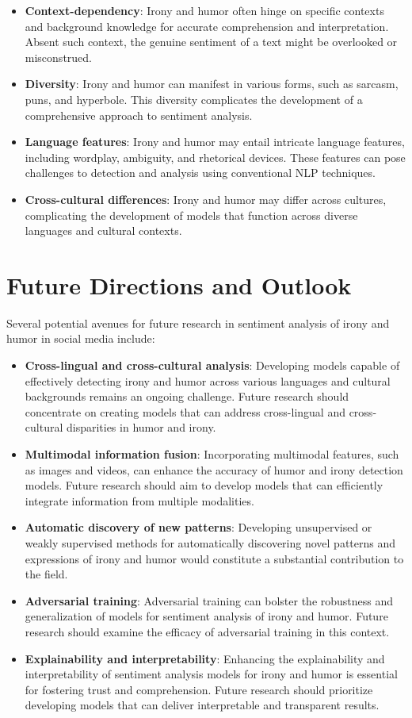\documentclass[a4paper]{article}
\begin{document}
\begin{itemize}
\item \textbf{Context-dependency}: Irony and humor often hinge on specific contexts and background knowledge for accurate comprehension and interpretation. Absent such context, the genuine sentiment of a text might be overlooked or misconstrued.
\item \textbf{Diversity}: Irony and humor can manifest in various forms, such as sarcasm, puns, and hyperbole. This diversity complicates the development of a comprehensive approach to sentiment analysis.
\item \textbf{Language features}: Irony and humor may entail intricate language features, including wordplay, ambiguity, and rhetorical devices. These features can pose challenges to detection and analysis using conventional NLP techniques.
\item \textbf{Cross-cultural differences}: Irony and humor may differ across cultures, complicating the development of models that function across diverse languages and cultural contexts.
\end{itemize}

\section{Future Directions and Outlook}
Several potential avenues for future research in sentiment analysis of irony and humor in social media include:

\begin{itemize}
\item \textbf{Cross-lingual and cross-cultural analysis}: Developing models capable of effectively detecting irony and humor across various languages and cultural backgrounds remains an ongoing challenge. Future research should concentrate on creating models that can address cross-lingual and cross-cultural disparities in humor and irony.
\item \textbf{Multimodal information fusion}: Incorporating multimodal features, such as images and videos, can enhance the accuracy of humor and irony detection models. Future research should aim to develop models that can efficiently integrate information from multiple modalities.
\item \textbf{Automatic discovery of new patterns}: Developing unsupervised or weakly supervised methods for automatically discovering novel patterns and expressions of irony and humor would constitute a substantial contribution to the field.
\item \textbf{Adversarial training}: Adversarial training can bolster the robustness and generalization of models for sentiment analysis of irony and humor. Future research should examine the efficacy of adversarial training in this context.
\item \textbf{Explainability and interpretability}: Enhancing the explainability and interpretability of sentiment analysis models for irony and humor is essential for fostering trust and comprehension. Future research should prioritize developing models that can deliver interpretable and transparent results.
\end{itemize}
\end{document}
